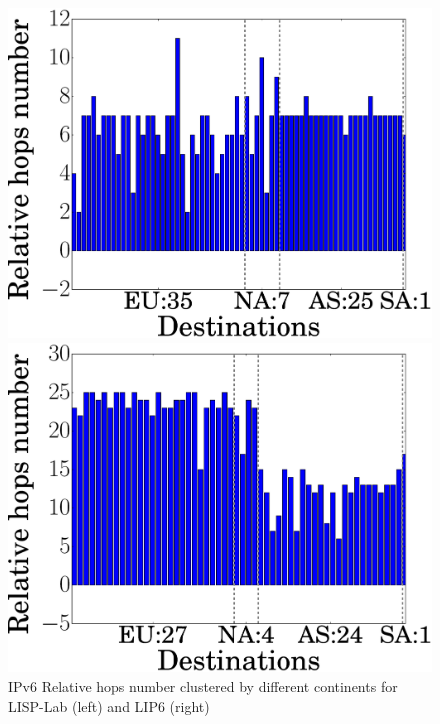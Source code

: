 \begin{figure}[!t]
	\begin{minipage}[c]{.49\linewidth}
		\begin{center}
			\includegraphics[width=\textwidth]{Pics/v6/Relative_hops_num_LISP-Lab-FranceIX_changed_60.eps}
		\end{center}
	\end{minipage}
	\begin{minipage}[c]{.49\linewidth}
		\begin{center}
			\includegraphics[width=\textwidth]{Pics/v6/Relative_hops_num_LIP6-FranceIX_changed_60.eps}
		\end{center}
	\end{minipage}
	\vspace{-0.5mm}
	\caption{IPv6 Relative hops number clustered by different continents for LISP-Lab (left) and LIP6 (right)}
	\label{v6_Relative_hops_num}
\end{figure}


